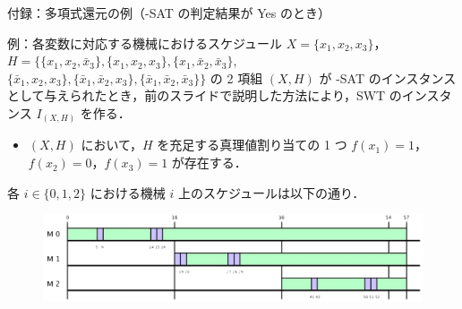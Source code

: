\documentclass[dvipdfmx]{beamer}
\begin{document}
    \begin{frame}

    \end{frame}
    \begin{frame}{付録：多項式還元の例（{-SAT} の判定結果が Yes のとき）}
      \begin{exampleblock}{例：各変数に対応する機械におけるスケジュール}
        $X = \{x_1,x_2,x_3\}$，$H = \big\{
        \{x_1,x_2,\bar x_3\},
        \{x_1,x_2,x_3\},
        \{x_1,\bar x_2,\bar x_3\},$
        \\
        $\{\bar x_1,x_2,x_3\},
        \{\bar x_1,\bar x_2,x_3\},
        \{\bar x_1,\bar x_2,\bar x_3\}
        \big\}$ の 2 項組 $(X,H)$ が {-SAT} のインスタンスとして与えられたとき，前のスライドで説明した方法により，SWT のインスタンス $I_{(X,H)}$ を作る．
        \begin{itemize}
          \item $(X,H)$ において，$H$ を充足する真理値割り当ての 1 つ $f(x_1) = 1$，$f(x_2) = 0$，$f(x_3) = 1$ が存在する．
        \end{itemize}
        各 $i \in \{0,1,2\}$ における機械 $i$ 上のスケジュールは以下の通り．
        \begin{figure}[h]
          \centering
          \includegraphics[width = 12cm]{figure/reductionExample1.pdf}
        \end{figure}
      \end{exampleblock}
    \end{frame}
\end{document}
